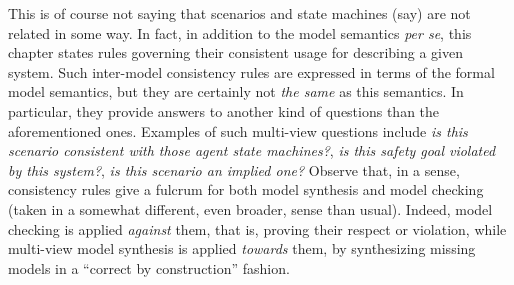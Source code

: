 This is of course not saying that scenarios and state machines (say) are not related in some way. In fact, in addition to the model semantics \emph{per se}, this chapter states rules governing their consistent usage for describing a given system. Such inter-model consistency rules are expressed in terms of the formal model semantics, but they are certainly not \emph{the same} as this semantics. In particular, they provide answers to another kind of questions than the aforementioned ones. Examples of such multi-view questions include \emph{is this scenario consistent with those agent state machines?}, \emph{is this safety goal violated by this system?}, \emph{is this scenario an implied one?} Observe that, in a sense, consistency rules give a fulcrum for both model synthesis and model checking (taken in a somewhat different, even broader, sense than usual). Indeed, model checking is applied \emph{against} them, that is, proving their respect or violation, while multi-view model synthesis is applied \emph{towards} them, by synthesizing missing models in a ``correct by construction'' fashion.

